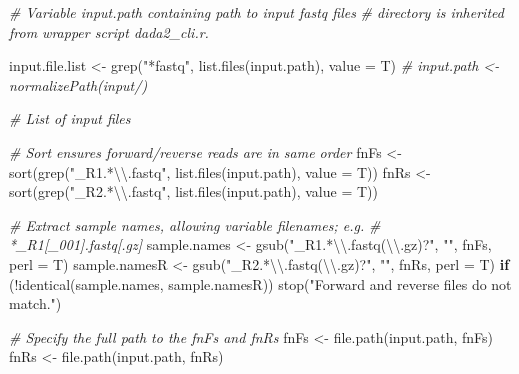 \documentclass[
]{article}
\newenvironment{Shaded}{\begin{snugshade}}{\end{snugshade}}
\newcommand{\AttributeTok}[1]{\textcolor[rgb]{0.77,0.63,0.00}{#1}}
\newcommand{\CommentTok}[1]{\textcolor[rgb]{0.56,0.35,0.01}{\textit{#1}}}
\newcommand{\ControlFlowTok}[1]{\textcolor[rgb]{0.13,0.29,0.53}{\textbf{#1}}}
\newcommand{\FunctionTok}[1]{\textcolor[rgb]{0.00,0.00,0.00}{#1}}
\newcommand{\NormalTok}[1]{#1}
\newcommand{\OtherTok}[1]{\textcolor[rgb]{0.56,0.35,0.01}{#1}}
\newcommand{\SpecialCharTok}[1]{\textcolor[rgb]{0.00,0.00,0.00}{#1}}
\newcommand{\StringTok}[1]{\textcolor[rgb]{0.31,0.60,0.02}{#1}}
\begin{document}
\begin{Shaded}
\begin{Highlighting}[]
\CommentTok{\# Variable \textquotesingle{}input.path\textquotesingle{} containing path to input fastq files}
\CommentTok{\# directory is inherited from wrapper script dada2\_cli.r.}


\NormalTok{input.file.list }\OtherTok{\textless{}{-}} \FunctionTok{grep}\NormalTok{(}\StringTok{"*fastq"}\NormalTok{, }\FunctionTok{list.files}\NormalTok{(input.path), }\AttributeTok{value =}\NormalTok{ T)}
\CommentTok{\# input.path \textless{}{-} normalizePath(\textquotesingle{}input/\textquotesingle{})}

\CommentTok{\# List of input files}

\CommentTok{\# Sort ensures forward/reverse reads are in same order}
\NormalTok{fnFs }\OtherTok{\textless{}{-}} \FunctionTok{sort}\NormalTok{(}\FunctionTok{grep}\NormalTok{(}\StringTok{"\_R1.*}\SpecialCharTok{\textbackslash{}\textbackslash{}}\StringTok{.fastq"}\NormalTok{, }\FunctionTok{list.files}\NormalTok{(input.path), }\AttributeTok{value =}\NormalTok{ T))}
\NormalTok{fnRs }\OtherTok{\textless{}{-}} \FunctionTok{sort}\NormalTok{(}\FunctionTok{grep}\NormalTok{(}\StringTok{"\_R2.*}\SpecialCharTok{\textbackslash{}\textbackslash{}}\StringTok{.fastq"}\NormalTok{, }\FunctionTok{list.files}\NormalTok{(input.path), }\AttributeTok{value =}\NormalTok{ T))}

\CommentTok{\# Extract sample names, allowing variable filenames; e.g.}
\CommentTok{\# *\_R1[\_001].fastq[.gz]}
\NormalTok{sample.names }\OtherTok{\textless{}{-}} \FunctionTok{gsub}\NormalTok{(}\StringTok{"\_R1.*}\SpecialCharTok{\textbackslash{}\textbackslash{}}\StringTok{.fastq(}\SpecialCharTok{\textbackslash{}\textbackslash{}}\StringTok{.gz)?"}\NormalTok{, }\StringTok{""}\NormalTok{, fnFs, }\AttributeTok{perl =}\NormalTok{ T)}
\NormalTok{sample.namesR }\OtherTok{\textless{}{-}} \FunctionTok{gsub}\NormalTok{(}\StringTok{"\_R2.*}\SpecialCharTok{\textbackslash{}\textbackslash{}}\StringTok{.fastq(}\SpecialCharTok{\textbackslash{}\textbackslash{}}\StringTok{.gz)?"}\NormalTok{, }\StringTok{""}\NormalTok{, fnRs, }\AttributeTok{perl =}\NormalTok{ T)}
\ControlFlowTok{if}\NormalTok{ (}\SpecialCharTok{!}\FunctionTok{identical}\NormalTok{(sample.names, sample.namesR)) }\FunctionTok{stop}\NormalTok{(}\StringTok{"Forward and reverse files do not match."}\NormalTok{)}

\CommentTok{\# Specify the full path to the fnFs and fnRs}
\NormalTok{fnFs }\OtherTok{\textless{}{-}} \FunctionTok{file.path}\NormalTok{(input.path, fnFs)}
\NormalTok{fnRs }\OtherTok{\textless{}{-}} \FunctionTok{file.path}\NormalTok{(input.path, fnRs)}
\end{Highlighting}
\end{Shaded}
\end{document}

